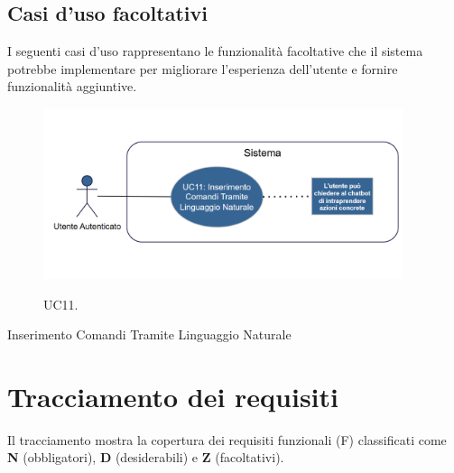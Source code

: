 \subsection{Casi d'uso facoltativi}
I seguenti casi d'uso rappresentano le funzionalità facoltative che il sistema potrebbe implementare per migliorare l'esperienza dell'utente e fornire funzionalità aggiuntive.

\begin{figure}[htbp]
    \centering
    \includegraphics[alt={Diagramma UML Inserimento Comandi Tramite Linguaggio Naturale}, height=5cm]{img/usecase/UC11.png}
    \caption{UC11.}
    \label{fig:uc11_comandi_nl}
\end{figure}

\begin{usecase}{11}{Inserimento Comandi Tramite Linguaggio Naturale}
\label{uc:uc11_comandi_nl}
\end{usecase}

\newpage

\section{Tracciamento dei requisiti}
Il tracciamento mostra la copertura dei requisiti funzionali (F) classificati come
\textbf{N} (obbligatori), \textbf{D} (desiderabili) e \textbf{Z} (facoltativi).

